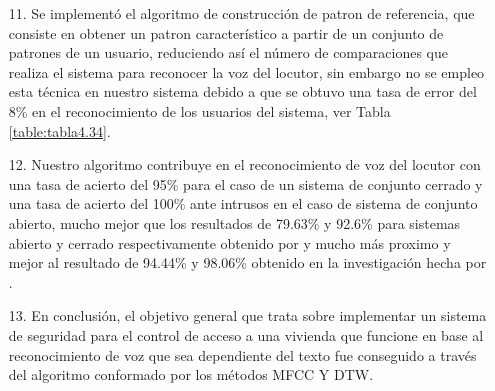 \begin{enumerate}
\item[11.]Se implementó el algoritmo de construcción de patron de referencia, que consiste en obtener un patron característico a partir de un conjunto de patrones de un usuario, reduciendo así el número de comparaciones que realiza el sistema para reconocer la voz del locutor, sin embargo no se empleo esta técnica en nuestro sistema debido a que se obtuvo una tasa de error del 8\% en el reconocimiento de los usuarios del sistema, ver Tabla \ref{table:tabla4.34}.

\item[12.]Nuestro algoritmo contribuye en el reconocimiento de voz del locutor con una tasa de acierto del 95\% para el caso de un sistema de conjunto cerrado y una tasa de acierto del 100\% ante intrusos en el caso de sistema de conjunto abierto, mucho mejor que los resultados de 79.63\% y 92.6\% para sistemas abierto y cerrado respectivamente obtenido por \cite{eyra} y mucho más proximo y mejor al resultado de 94.44\% y 98.06\% obtenido en la investigación hecha por \cite{varela}.

\item[13.]En conclusión, el objetivo general que trata sobre implementar un sistema de seguridad para el control de acceso a una vivienda que funcione en base al reconocimiento de voz que sea dependiente del texto fue conseguido a través del algoritmo conformado por los métodos MFCC Y DTW.
\end{enumerate}

